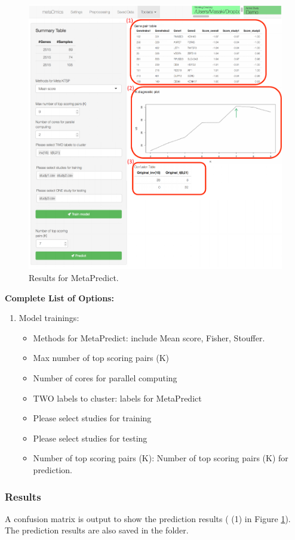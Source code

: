 \begin{steps}
\begin{figure}[H]
\begin{center}
\includegraphics[scale=0.8]{./figure/MetaPredict/MetaPredictresult.pdf}
\caption{Results for MetaPredict.}
\label{fig:MetaPredictresult}
\end{center}
\end{figure}

\end{steps}

\textbf{Complete List of Options:} 
\begin{enumerate}
\item Model trainings: 
\begin{itemize}
\item Methods for MetaPredict: include Mean score, Fisher, Stouffer.
\item Max number of top scoring pairs (K)
\item Number of cores for parallel computing
\item TWO labels to cluster: labels for MetaPredict
\item Please select studies for training
\item Please select studies for testing
\item Number of top scoring pairs (K): Number of top scoring pairs (K) for prediction.
\end{itemize}

\end{enumerate}

\subsubsection{Results}

A confusion matrix is output to show the prediction results ({\color{red} (1)} in Figure \ref{fig:MetaPredictresult}).
The prediction results are also saved in the folder.

